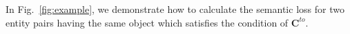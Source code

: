 In Fig.~\ref{fig:example}, we demonstrate how to calculate the semantic loss for two entity pairs having the same object which satisfies the condition of $\bm{C}^{to}$.
\iffalse




